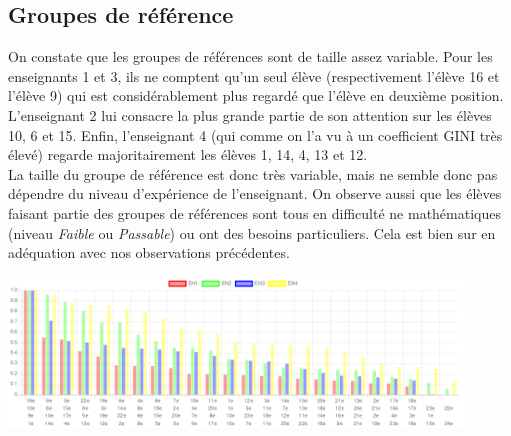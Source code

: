 \documentclass{article}
\begin{document}
\subsection{Groupes de référence}
On constate que les groupes de références sont de taille assez variable. Pour les enseignants 1 et 3, ils ne comptent qu'un seul élève (respectivement l'élève 16 et l'élève 9) qui est considérablement plus regardé que l'élève en deuxième position. L'enseignant 2 lui consacre la plus grande partie de son attention sur les élèves 10, 6 et 15. Enfin, l'enseignant 4 (qui comme on l'a vu à un coefficient GINI très élevé) regarde majoritairement les élèves 1, 14, 4, 13 et 12.\\
La taille du groupe de référence est donc très variable, mais ne semble donc pas dépendre du niveau d'expérience de l'enseignant. On observe aussi que les élèves faisant partie des groupes de références sont tous en difficulté ne mathématiques (niveau \textit{Faible} ou \textit{Passable}) ou ont des besoins particuliers. Cela est bien sur en adéquation avec nos observations précédentes.
\begin{center}
    \includegraphics[height=4cm]{ordre_decroissant.png}
\end{center}
\end{document}
